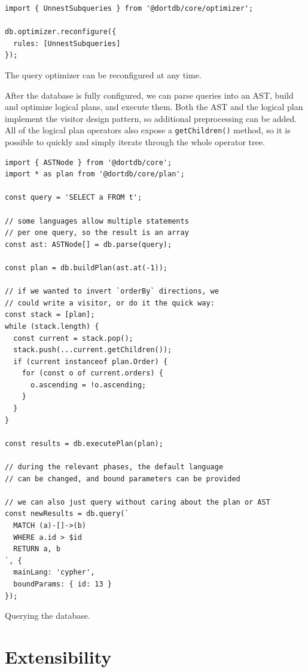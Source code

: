 \begin{listing}[!ht]
\begin{verbatim}
import { UnnestSubqueries } from '@dortdb/core/optimizer';

db.optimizer.reconfigure({
  rules: [UnnestSubqueries]
});
\end{verbatim}
\caption{The query optimizer can be reconfigured at any time.}
\end{listing}

After the database is fully configured, we can parse queries into an AST, build and optimize logical plans, and execute them. Both the AST and the logical plan implement the visitor design pattern, so additional preprocessing can be added. All of the logical plan operators also expose a \texttt{getChildren()} method, so it is possible to quickly and simply iterate through the whole operator tree.

\begin{listing}[!ht]
\begin{verbatim}
import { ASTNode } from '@dortdb/core';
import * as plan from '@dortdb/core/plan';

const query = 'SELECT a FROM t';

// some languages allow multiple statements
// per one query, so the result is an array
const ast: ASTNode[] = db.parse(query);

const plan = db.buildPlan(ast.at(-1));

// if we wanted to invert `orderBy` directions, we
// could write a visitor, or do it the quick way:
const stack = [plan];
while (stack.length) {
  const current = stack.pop();
  stack.push(...current.getChildren());
  if (current instanceof plan.Order) {
    for (const o of current.orders) {
      o.ascending = !o.ascending;
    }
  }
}

const results = db.executePlan(plan);

// during the relevant phases, the default language
// can be changed, and bound parameters can be provided

// we can also just query without caring about the plan or AST
const newResults = db.query(`
  MATCH (a)-[]->(b)
  WHERE a.id > $id
  RETURN a, b
`, {
  mainLang: 'cypher',
  boundParams: { id: 13 }
});
\end{verbatim}
\caption{Querying the database.}
\end{listing}

\section{Extensibility}
\label{sec:usage-extensibility}

